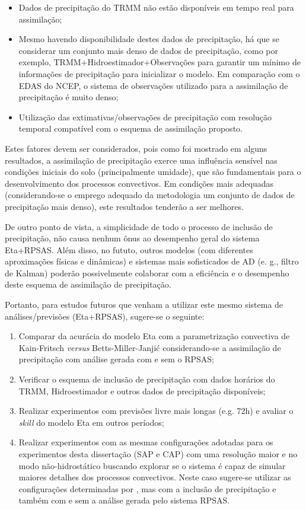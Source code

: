 \begin{itemize}
\item Dados de precipitação do TRMM não estão disponíveis em tempo real para assimilação;
\item Mesmo havendo disponibilidade destes dados de precipitação, há que se considerar um conjunto mais denso de dados de precipitação, como por exemplo, TRMM+Hidroestimador+Observações para garantir um mínimo de informações de precipitação para inicializar o modelo. Em comparação com o EDAS do NCEP, o sistema de observações utilizado para a assimilação de precipitação é muito denso;
\item Utilização das extimativas/observações de precipitação com resolução temporal compatível com o esquema de assimilação proposto.
\end{itemize}

Estes fatores devem ser considerados, pois como foi mostrado em alguns resultados, a assimilação de precipitação exerce uma influência sensível nas condições iniciais do solo (principalmente umidade), que são fundamentais para o desenvolvimento dos processos convectivos. Em condições mais adequadas (considerando-se o emprego adequado da metodologia um conjunto de dados de precipitação mais denso), este resultados tenderão a ser melhores.

De outro ponto de vista, a simplicidade de todo o processo de inclusão de precipitação, não causa nenhum ônus ao desempenho geral do sistema Eta+RPSAS. Além disso, no fututo, outros modelos (com diferentes aproximações físicas e dinâmicas) e sistemas mais sofisticados de AD (e. g., filtro de Kalman) poderão possivelmente colaborar com a eficiência e o desempenho deste esquema de assimilação de precipitação.

Portanto, para estudos futuros que venham a utilizar este mesmo sistema de análises/previsões (Eta+RPSAS), sugere-se o seguinte:

\begin{enumerate}
\item Comparar da acurácia do modelo Eta com a parametrização convectiva de Kain-Fritsch \textit{versus} Betts-Miller-Janjić considerando-se a assimilação de precipitação com análise gerada com e sem o RPSAS;
\item Verificar o esquema de inclusão de precipitação com dados horários do TRMM, Hidroestimador e outros dados de precipitação disponíveis;
\item Realizar experimentos com previsões livre mais longas (e.g. 72h) e avaliar o \textit{skill} do modelo Eta em outros períodos;
\item Realizar experimentos com as mesmas configurações adotadas para os experimentos desta dissertação (SAP e CAP) com uma resolução maior e no modo não-hidrostático buscando explorar se o sistema é capaz de simular maiores detalhes dos processos convectivos. Neste caso sugere-se utilizar as configurações determinadas por , mas com a inclusão de precipitação e também com e sem a análise gerada pelo sistema RPSAS.
\end{enumerate}
